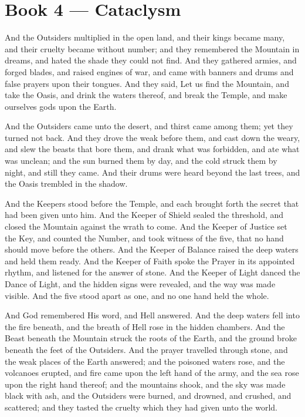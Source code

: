 \section*{Book 4 --- Cataclysm}

And the Outsiders multiplied in the open land, and their kings became many, and their cruelty became without number; and they remembered the Mountain in dreams, and hated the shade they could not find. And they gathered armies, and forged blades, and raised engines of war, and came with banners and drums and false prayers upon their tongues. And they said, Let us find the Mountain, and take the Oasis, and drink the waters thereof, and break the Temple, and make ourselves gods upon the Earth.

And the Outsiders came unto the desert, and thirst came among them; yet they turned not back. And they drove the weak before them, and cast down the weary, and slew the beasts that bore them, and drank what was forbidden, and ate what was unclean; and the sun burned them by day, and the cold struck them by night, and still they came. And their drums were heard beyond the last trees, and the Oasis trembled in the shadow.

And the Keepers stood before the Temple, and each brought forth the secret that had been given unto him. And the Keeper of Shield sealed the threshold, and closed the Mountain against the wrath to come. And the Keeper of Justice set the Key, and counted the Number, and took witness of the five, that no hand should move before the others. And the Keeper of Balance raised the deep waters and held them ready. And the Keeper of Faith spoke the Prayer in its appointed rhythm, and listened for the answer of stone. And the Keeper of Light danced the Dance of Light, and the hidden signs were revealed, and the way was made visible. And the five stood apart as one, and no one hand held the whole.

And God remembered His word, and Hell answered. And the deep waters fell into the fire beneath, and the breath of Hell rose in the hidden chambers. And the Beast beneath the Mountain struck the roots of the Earth, and the ground broke beneath the feet of the Outsiders. And the prayer travelled through stone, and the weak places of the Earth answered; and the poisoned waters rose, and the volcanoes erupted, and fire came upon the left hand of the army, and the sea rose upon the right hand thereof; and the mountains shook, and the sky was made black with ash, and the Outsiders were burned, and drowned, and crushed, and scattered; and they tasted the cruelty which they had given unto the world.

